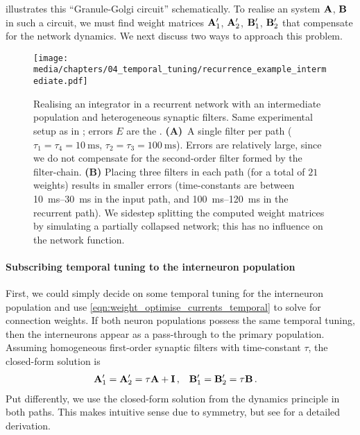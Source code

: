  illustrates this \enquote{Granule-Golgi circuit} schematically.
To realise an \LTI system $\mathbf{A}$, $\mathbf{B}$ in such a circuit, we must find weight matrices $\mathbf{A}_1'$, $\mathbf{A}_2'$, $\mathbf{B}_1'$, $\mathbf{B}_2'$ that compensate for the network dynamics.
We next discuss two ways to approach this problem.

\begin{figure}
	\texttt{[image: media/chapters/04\_temporal\_tuning/recurrence\_example\_intermediate.pdf]}
	\caption[Realising an integrator in a recurrent network with an intermediate population]{Realising an integrator in a recurrent network with an intermediate population and heterogeneous synaptic filters. Same experimental setup as in ; errors $E$ are the \NRMSE.
	\textbf{(A)}~A single filter per path ($\tau_1 = \tau_4 = \SI{10}{\milli\second}$, $\tau_2 = \tau_3 = \SI{100}{\milli\second}$).
	Errors are relatively large, since we do not compensate for the second-order filter formed by the filter-chain.
	\textbf{(B)} Placing three filters in each path (for a total of $21$ weights) results in smaller errors (time-constants are between \SIrange{10}{30}{\milli\second} in the input path, and \SIrange{100}{120}{\milli\second} in the recurrent path).
	We sidestep splitting the computed weight matrices by simulating a partially collapsed network; this has no influence on the network function.
	}
	\label{fig:recurrence_example_intermediate}
\end{figure}

\paragraph{Subscribing temporal tuning to the interneuron population}
First, we could simply decide on some temporal tuning for the interneuron population and use \cref{eqn:weight_optimise_currents_temporal} to solve for connection weights.
If both neuron populations possess the same temporal tuning, then the interneurons appear as a pass-through to the primary population.
Assuming homogeneous first-order synaptic filters with time-constant $\tau$, the closed-form solution is
\begin{align}
	\mathbf{A}_1' &= \mathbf{A}_2' = \tau \mathbf{A} + \mathbf{I} \,, & \mathbf{B}_1' &= \mathbf{B}_2' = \tau \mathbf{B} \,.
\end{align}
Put differently, we use the closed-form solution from the \NEF dynamics principle in both paths.
This makes intuitive sense due to symmetry, but see  for a detailed derivation.

